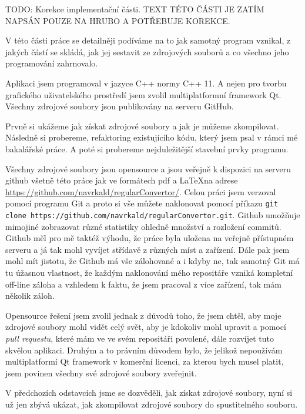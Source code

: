 
TODO: Korekce implementační části. TEXT TÉTO ČÁSTI JE ZATÍM NAPSÁN POUZE NA HRUBO A POTŘEBUJE KOREKCE.

V této části práce se detailněji podíváme na to jak samotný program vznikal, z jakých částí se skládá, jak jej sestavit ze zdrojových souborů a co všechno jeho programování zahrnovalo.

Aplikaci jsem programoval v jazyce C++ normy C++ 11. A nejen pro tvorbu grafického uživatelského prostředí jsem zvolil multiplatformní framework Qt. Všechny zdrojové soubory jsou publikovány na serveru GitHub.

Prvně si ukážeme jak získat zdrojové soubory a jak je můžeme zkompilovat. Následně si probereme, refaktoring existujícího kódu, který jsem psal v rámci mé bakalářské práce. A poté si probereme nejduležitější stavební prvky programu.


Všechny zdrojové soubory jsou opensource a jsou veřejně k dispozici na serveru github všetně této práce jak ve formátech pdf a \LaTeX na adrese \url{https://github.com/navrkald/regularConvertor/}. Celou práci jsem verzoval pomocí programu Git a proto si vše můžete naklonovat pomocí příkazu \texttt{git clone https://github.com/navrkald/regularConvertor.git}. Github umožňuje mimojiné zobrazovat různé statistiky ohledně množství a rozložení commitů. Github měl pro mě taktéž výhodu, že práce byla uložena na veřejně přístupném serveru a já tak mohl vyvíjet střídavě z různých míst a zařízení. Dále pak jsem mohl mít jistotu, že Github má vše zálohované a i kdyby ne, tak samotný Git má tu úžasnou vlastnost, že každým naklonování mého repositáře vzniká kompletní off-line záloha a vzhledem k faktu, že jsem pracoval z více zařízení, tak mám několik záloh.

Opensource řešení jsem zvolil jednak z důvodů toho, že jsem chtěl, aby moje zdrojové soubory mohl vidět celý svět, aby je kdokoliv mohl upravit a pomocí \textit{pull requestu}, které mám ve ve svém repositáři povolené, dále rozvíjet tuto skvělou aplikaci. Druhým a to právním důvodem bylo, že jelikož nepoužívám multiplatformí Qt framework v komerční licenci, za kterou bych musel platit, jsem povinen všechny své zdrojové soubory zveřejnit.

V předchozích odstavcích jsme se dozvěděli, jak získat zdrojové soubory, nyní si už jen zbývá ukázat, jak zkompilovat zdrojové soubory do spustitelného souboru. 

